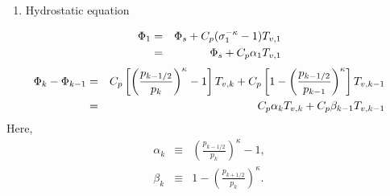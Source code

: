 \begin{enumerate}
\def\labelenumi{\arabic{enumi}.}
\setcounter{enumi}{1}
\tightlist
\item
  Hydrostatic equation
\end{enumerate}
\begin{eqnarray}
 \Phi_{1}  &=&  \Phi_{s} + C_{p} ( \sigma_{1}^{-\kappa} - 1  ) T_{v,1} \notag\\
           &=&  \Phi_{s} + C_{p} \alpha_{1} T_{v,1}
\end{eqnarray}
\begin{eqnarray}
 \Phi_k - \Phi_{k-1}
  &=&  C_{p}
   \left[ \left( \frac{ p_{k-1/2} }{ p_k } \right)^{\kappa}
          - 1 \right] T_{v,k}
       + C_{p}
   \left[ 1-
         \left( \frac{ p_{k-1/2} }{ p_{k-1} } \right)^{\kappa}
              \right] T_{v,k-1} \notag\\
   &=&    C_{p} \alpha_k T_{v,k} + C_{p} \beta_{k-1} T_{v,k-1}
\end{eqnarray}
Here,
\begin{eqnarray}
 \alpha_k &\equiv & \left( \frac{ p_{k-1/2} }
                               { p_k } \right)^{\kappa} -1, \\
 \beta_k &\equiv &  1- \left( \frac{ p_{k+1/2} }
                               { p_k } \right)^{\kappa} .
\end{eqnarray}

